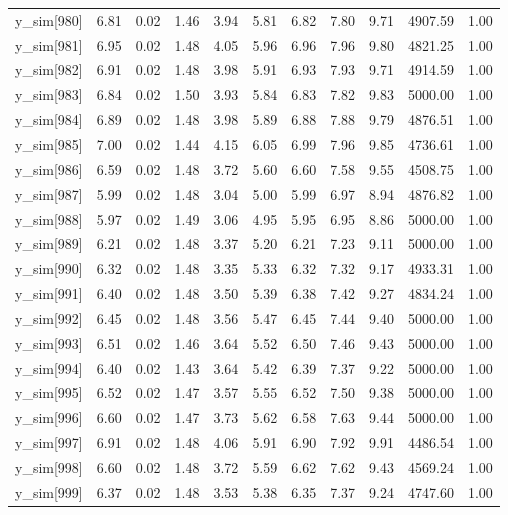 \begin{table}[ht]
\begin{tabular}{rrrrrrrrrrr}
  y\_sim[980] & 6.81 & 0.02 & 1.46 & 3.94 & 5.81 & 6.82 & 7.80 & 9.71 & 4907.59 & 1.00 \\ 
  y\_sim[981] & 6.95 & 0.02 & 1.48 & 4.05 & 5.96 & 6.96 & 7.96 & 9.80 & 4821.25 & 1.00 \\ 
  y\_sim[982] & 6.91 & 0.02 & 1.48 & 3.98 & 5.91 & 6.93 & 7.93 & 9.71 & 4914.59 & 1.00 \\ 
  y\_sim[983] & 6.84 & 0.02 & 1.50 & 3.93 & 5.84 & 6.83 & 7.82 & 9.83 & 5000.00 & 1.00 \\ 
  y\_sim[984] & 6.89 & 0.02 & 1.48 & 3.98 & 5.89 & 6.88 & 7.88 & 9.79 & 4876.51 & 1.00 \\ 
  y\_sim[985] & 7.00 & 0.02 & 1.44 & 4.15 & 6.05 & 6.99 & 7.96 & 9.85 & 4736.61 & 1.00 \\ 
  y\_sim[986] & 6.59 & 0.02 & 1.48 & 3.72 & 5.60 & 6.60 & 7.58 & 9.55 & 4508.75 & 1.00 \\ 
  y\_sim[987] & 5.99 & 0.02 & 1.48 & 3.04 & 5.00 & 5.99 & 6.97 & 8.94 & 4876.82 & 1.00 \\ 
  y\_sim[988] & 5.97 & 0.02 & 1.49 & 3.06 & 4.95 & 5.95 & 6.95 & 8.86 & 5000.00 & 1.00 \\ 
  y\_sim[989] & 6.21 & 0.02 & 1.48 & 3.37 & 5.20 & 6.21 & 7.23 & 9.11 & 5000.00 & 1.00 \\ 
  y\_sim[990] & 6.32 & 0.02 & 1.48 & 3.35 & 5.33 & 6.32 & 7.32 & 9.17 & 4933.31 & 1.00 \\ 
  y\_sim[991] & 6.40 & 0.02 & 1.48 & 3.50 & 5.39 & 6.38 & 7.42 & 9.27 & 4834.24 & 1.00 \\ 
  y\_sim[992] & 6.45 & 0.02 & 1.48 & 3.56 & 5.47 & 6.45 & 7.44 & 9.40 & 5000.00 & 1.00 \\ 
  y\_sim[993] & 6.51 & 0.02 & 1.46 & 3.64 & 5.52 & 6.50 & 7.46 & 9.43 & 5000.00 & 1.00 \\ 
  y\_sim[994] & 6.40 & 0.02 & 1.43 & 3.64 & 5.42 & 6.39 & 7.37 & 9.22 & 5000.00 & 1.00 \\ 
  y\_sim[995] & 6.52 & 0.02 & 1.47 & 3.57 & 5.55 & 6.52 & 7.50 & 9.38 & 5000.00 & 1.00 \\ 
  y\_sim[996] & 6.60 & 0.02 & 1.47 & 3.73 & 5.62 & 6.58 & 7.63 & 9.44 & 5000.00 & 1.00 \\ 
  y\_sim[997] & 6.91 & 0.02 & 1.48 & 4.06 & 5.91 & 6.90 & 7.92 & 9.91 & 4486.54 & 1.00 \\ 
  y\_sim[998] & 6.60 & 0.02 & 1.48 & 3.72 & 5.59 & 6.62 & 7.62 & 9.43 & 4569.24 & 1.00 \\ 
  y\_sim[999] & 6.37 & 0.02 & 1.48 & 3.53 & 5.38 & 6.35 & 7.37 & 9.24 & 4747.60 & 1.00 \\ 

\end{tabular}
\end{table}
